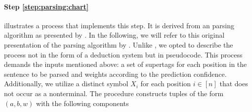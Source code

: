 \documentclass[../../document.tex]{subfiles}
\begin{document}
    \paragraph{Step \ref{step:parsing:chart}}
     illustrates a process that implements this step.
    It is derived from an  parsing algorithm as presented by \citet[the na\"ive algorithm in Section~3]{Burden05}.
    In the following, we will refer to this original presentation of the parsing algorithm by .
    Unlike , we opted to describe the process not in the form of a deduction system but in pseudocode.
    This process demands the inputs mentioned above: a set of supertags for each position in the sentence to be parsed and weights according to the prediction confidence.
    Additionally, we utilize a distinct symbol \(X_i\) for each position \(i \in [n]\) that does not occur as a nonterminal.
    The procedure constructs tuples of the form \((a, b, w)\) with the following components
\end{document}
